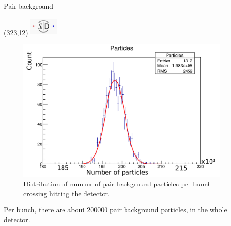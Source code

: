 \documentclass[xcolor={dvipsnames}]{beamer}
\newcommand{\sidlogo}{
  \setlength{\TPHorizModule}{1pt}
  \setlength{\TPVertModule}{1pt}
  \begin{textblock}{1}(323,12)
   \includegraphics[width=40pt,height=26pt]{figures/SiD.jpeg}
  \end{textblock}
  }
\begin{document}
\begin{frame}{Pair background}
\sidlogo
 \begin{figure}
 	\begin{columns}
        \begin{flushright}
        \includegraphics[height=0.55\textheight]{figures/sidloi3_pairs_1312_EcalEndcap_HitsPerFile_Particles.png}
        \end{flushright}
        \begin{flushleft}
        \caption{\small Distribution of number of pair background particles per bunch crossing hitting the detector.}
        \end{flushleft}
      \end{columns}
\end{figure}
Per bunch, there are about \num{200000} pair background particles, in the whole detector.\\
\end{frame}
\end{document}
